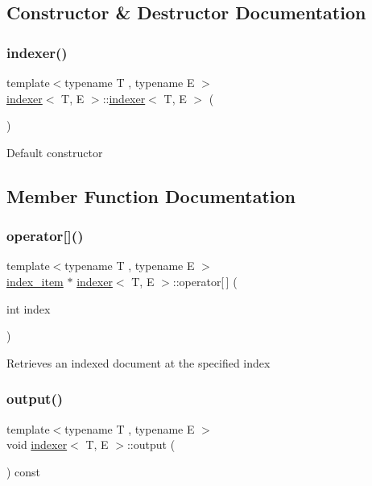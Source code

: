 \subsection{Constructor \& Destructor Documentation}
\mbox{\label{classindexer_acec32e69288ecb53d04672ce28cb6f25}} 
\subsubsection{\texorpdfstring{indexer()}{indexer()}}
{\footnotesize\ttfamily template$<$typename T , typename E $>$ \\
\hyperlink{classindexer}{indexer}$<$ T, E $>$\+::\hyperlink{classindexer}{indexer}$<$ T, E $>$ (\begin{DoxyParamCaption}{ }\end{DoxyParamCaption})}

Default constructor 

\subsection{Member Function Documentation}
\mbox{\label{classindexer_a44e2cc6e93dc86ea24a8406c041250be}} 
\subsubsection{\texorpdfstring{operator[]()}{operator[]()}}
{\footnotesize\ttfamily template$<$typename T , typename E $>$ \\
\hyperlink{classindex__item}{index\+\_\+item} $\ast$ \hyperlink{classindexer}{indexer}$<$ T, E $>$\+::operator\mbox{[}$\,$\mbox{]} (\begin{DoxyParamCaption}\item[{int}]{index }\end{DoxyParamCaption})}

Retrieves an indexed document at the specified index \mbox{\label{classindexer_a57326049d8cbb3ca7572b9b2e8cfcd87}} 
\subsubsection{\texorpdfstring{output()}{output()}}
{\footnotesize\ttfamily template$<$typename T , typename E $>$ \\
void \hyperlink{classindexer}{indexer}$<$ T, E $>$\+::output (\begin{DoxyParamCaption}{ }\end{DoxyParamCaption}) const}

